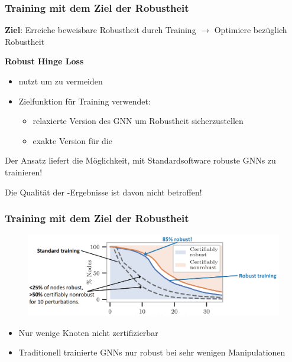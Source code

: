 \documentclass{beamer}
\begin{document}
\begin{frame}
  \frametitle{Training mit dem Ziel der Robustheit}

  \textbf{Ziel}: Erreiche beweisbare Robustheit durch Training\newline
  $\rightarrow$ Optimiere bezüglich Robustheit

  \textbf{Robust Hinge Loss}
  \begin{itemize}
    \item nutzt  um  zu vermeiden
    \item Zielfunktion für Training verwendet:
    \begin{itemize}
      \item relaxierte Version des GNN um Robustheit sicherzustellen
      \item exakte Version für die 
    \end{itemize}
  \end{itemize}  

  Der Ansatz liefert die Möglichkeit, mit Standardsoftware robuste GNNs zu trainieren!

  Die Qualität der -Ergebnisse ist davon nicht betroffen!
\end{frame}

\begin{frame}
  \frametitle{Training mit dem Ziel der Robustheit}
  \begin{figure}
    \centering
    \includegraphics[width=\textwidth]{img/robust_training.png}
    \caption*{ \cite{}}
  \end{figure}
  \begin{itemize}
    \item Nur wenige Knoten nicht zertifizierbar
    \item Traditionell trainierte GNNs nur robust bei sehr wenigen Manipulationen
  \end{itemize}
\end{frame}

\end{document}
